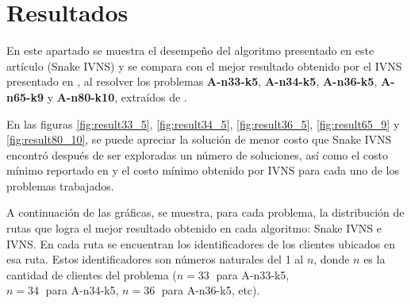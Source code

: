 \documentclass[a4paper,10pt,twocolumn]{article}
\begin{document}
\section{Resultados}\label{sec:res}
	En este apartado se muestra el desempeño del algoritmo presentado en este artículo
	(Snake IVNS) y se compara con el mejor resultado obtenido por el IVNS presentado en 
	\cite{Camila}, al resolver los problemas \textbf{A-n33-k5}, \textbf{A-n34-k5}, 
	\textbf{A-n36-k5}, \textbf{A-n65-k9} y \textbf{A-n80-k10}, extraídos de \cite{neo}.
	
	En las figuras \ref{fig:result33_5}, \ref{fig:result34_5}, \ref{fig:result36_5},
	\ref{fig:result65_9} y \ref{fig:result80_10}, se puede apreciar la solución de menor
	costo que Snake IVNS encontró después de ser exploradas un número de 
	soluciones, así como el costo mínimo reportado en \cite{neo} y el costo 
	mínimo obtenido por	IVNS para cada uno de los problemas trabajados.
	
	A continuación de las gráficas, se muestra, para cada problema, la distribución de 
	rutas que logra el mejor resultado obtenido en cada algoritmo: Snake IVNS e IVNS. 
	En cada ruta se encuentran los identificadores de los clientes ubicados	en esa ruta. 
	Estos identificadores son números naturales del 1 al $n$, donde $n$ es la cantidad 
	de clientes del problema ($n = 33\;$ para A-n33-k5, \\
	$n = 34\;$ para A-n34-k5, $n = 36\;$ para A-n36-k5, etc).
	
\end{document}

